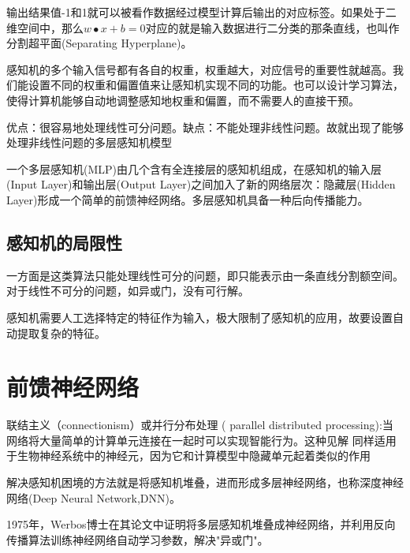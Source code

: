 \documentclass[openbib]{article}
\begin{document}
输出结果值-1和1就可以被看作数据经过模型计算后输出的对应标签。如果处于二维空间中，那么$w\bullet x + b=0$对应的就是输入数据进行二分类的那条直线，也叫作分割超平面(Separating Hyperplane)。
	
感知机的多个输入信号都有各自的权重，权重越大，对应信号的重要性就越高。我们能设置不同的权重和偏置值来让感知机实现不同的功能。也可以设计学习算法，使得计算机能够自动地调整感知地权重和偏置，而不需要人的直接干预。
	
优点：很容易地处理线性可分问题。缺点：不能处理非线性问题。故就出现了能够处理非线性问题的多层感知机模型
	
一个多层感知机(MLP)由几个含有全连接层的感知机组成，在感知机的输入层(Input Layer)和输出层(Output Layer)之间加入了新的网络层次：隐藏层(Hidden Layer)形成一个简单的前馈神经网络。多层感知机具备一种后向传播能力。
	
\subsection{感知机的局限性}
一方面是这类算法只能处理线性可分的问题，即只能表示由一条直线分割额空间。对于线性不可分的问题，如异或门，没有可行解。

感知机需要人工选择特定的特征作为输入，极大限制了感知机的应用，故要设置自动提取复杂的特征。
\section{前馈神经网络}
联结主义（connectionism）或并行分布处理 ( parallel distributed processing):当网络将大量简单的计算单元连接在一起时可以实现智能行为。这种见解
同样适用于生物神经系统中的神经元，因为它和计算模型中隐藏单元起着类似的作用

解决感知机困境的方法就是将感知机堆叠，进而形成多层神经网络，也称深度神经网络(Deep Neural Network,DNN)。

1975年，Werbos博士在其论文中证明将多层感知机堆叠成神经网络，并利用反向传播算法训练神经网络自动学习参数，解决"异或门"。
\end{document}
